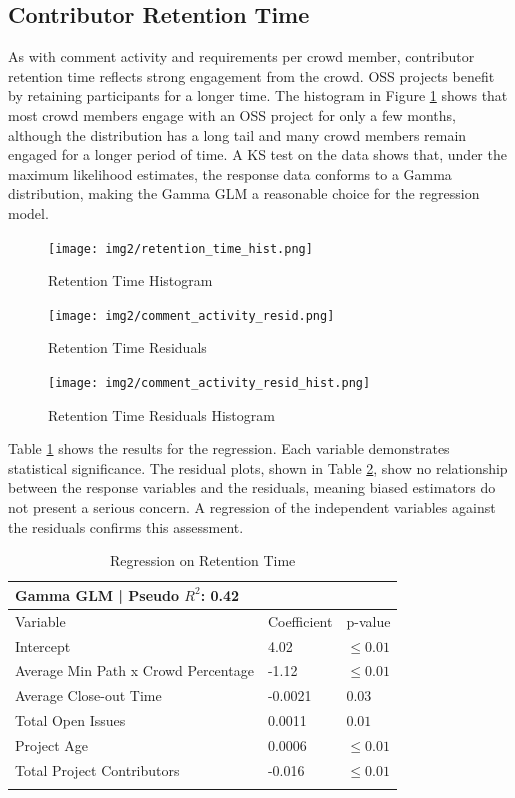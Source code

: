 \subsection{Contributor Retention Time}

As with comment activity and requirements per crowd member, contributor retention time reflects strong engagement from the crowd. OSS projects benefit by retaining participants for a longer time. The histogram in Figure \ref{retention_time_hist} shows that most crowd members engage with an OSS project for only a few months, although the distribution has a long tail and many crowd members remain engaged for a longer period of time. A KS test on the data shows that, under the maximum likelihood estimates, the response data conforms to a Gamma distribution, making the Gamma GLM a reasonable choice for the regression model. 

\begin{figure}
 \texttt{[image: img2/retention\_time\_hist.png]}
\caption{Retention Time Histogram}
\label{retention_time_hist}
\end{figure}

\begin{figure}
 \texttt{[image: img2/comment\_activity\_resid.png]}
\caption{Retention Time Residuals}
\label{retention_time_resid}
\end{figure}

\begin{figure}
 \texttt{[image: img2/comment\_activity\_resid\_hist.png]}
\caption{Retention Time Residuals Histogram}
\label{retention_time_resid_hist}
\end{figure}

Table \ref{retention_time_results} shows the results for the regression. Each variable demonstrates statistical significance. The residual plots, shown in Table \ref{retention_time_resid}, show no relationship between the response variables and the residuals, meaning biased estimators do not present a serious concern. A regression of the independent variables against the residuals confirms this assessment.

\begin{table}
\caption{Regression on Retention Time}
\label{retention_time_results}
\begin{tabular}{lll}
Gamma GLM | Pseudo $R^2$: 0.42 \\
\hline\noalign{\smallskip}
Variable & Coefficient & p-value  \\
\noalign{\smallskip}\hline\noalign{\smallskip}
Intercept &  4.02 & $\leq 0.01$ \\
Average Min Path x Crowd Percentage &  -1.12 & $\leq 0.01$ \\
Average Close-out Time &  -0.0021 &  $0.03$  \\
Total Open Issues &  0.0011 &  $0.01$    \\
Project Age &  0.0006 &  $\leq 0.01$    \\
Total Project Contributors &  -0.016 &  $\leq 0.01$ \\
\noalign{\smallskip}\hline
\end{tabular}
\end{table}

